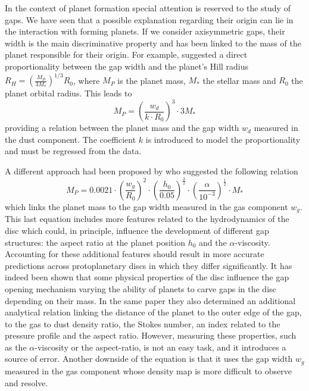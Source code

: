 \documentclass[a4paper,10pt]{report}
\begin{document}
In the context of planet formation special attention is reserved to the study of gaps. 
We have seen that a possible explanation regarding their origin can lie in the interaction with
forming planets. If we consider axisymmetric gaps, their width is the main discriminative property and
has been linked to the mass of the planet responsible for their origin.
For example, \citet{Lodato_2019} suggested a direct proportionality between the gap width and the planet's Hill radius 
$
    R_H = (\frac{M_P}{3M_*})^{1/3}R_0
$, where $M_P$ is the planet mass, $M_*$ the stellar mass and $R_0$ the planet orbital radius.
This leads to 
\begin{equation}
    M_P = (\frac{w_d}{k\cdot R_0})^3\cdot 3M_*
\end{equation}
providing a relation between the planet mass and the gap width $w_d$ measured in the dust component.
The coefficient $k$ is introduced to model the proportionality and must be regressed from the data.

A different approach had been proposed by \citet{kanagawa} who suggested the following relation
\begin{equation}
    M_P = 0.0021 \cdot \left( \frac{w_g}{R_0}\right)^2
    \cdot \left(\frac{h_0}{0.05}\right)^{\frac 32}
    \cdot \left(\frac{\alpha}{10^{-3}}\right)^{\frac 12}
    \cdot M_*
\end{equation}
which links the planet mass to the gap width measured in the gas component $w_g$.
This last equation includes more features related to the hydrodynamics of the disc which could, in principle,
influence the development of different gap structures: the aspect ratio at the planet position
$h_0$ and the $\alpha$-viscosity. Accounting for these additional features should result in more accurate predictions
across protoplanetary discs in which they differ significantly. It has indeed been shown
\citep{Dipierro_2017} that some physical properties of the disc 
 influence the gap opening mechanism varying the ability of planets to carve gaps
 in the disc depending on their mass. In the same paper they also 
 determined an additional analytical relation linking the distance of the planet to the outer edge of the gap,
 to the gas to dust density ratio, the Stokes number, an index related to the pressure profile and the aspect ratio. 
 However, measuring these properties, such as the $\alpha$-viscosity or the aspect-ratio,
is not an easy task, and it introduces a source of error.
Another downside of the \citet{kanagawa} equation is that it uses the gap width $w_g$ measured in the gas component 
whose density map is more difficult to observe and resolve.
\end{document}
